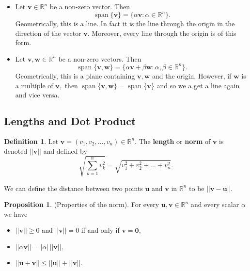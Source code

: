 \documentclass[12pt, a4paper]{article}
\theoremstyle{definition}
\newtheorem{definition}{Definition}[section]
\newtheorem{proposition}{Proposition}
\theoremstyle{plain}
\newcommand{\bb}[1]{\mathbb{#1}}
\newcommand{\vect}[1]{\mathbf{#1}}
\DeclareMathOperator{\Span}{span}
\begin{document}
\begin{itemize}

	\item Let $\vect{v} \in \bb{R}^n$ be a non-zero vector. Then $$\Span\{\vect{v}\}=\{\alpha\vect{v}:\alpha \in \bb{R}^n\}.$$ Geometrically, this is a line. In fact it is the line through the origin in the direction of the vector $\vect{v}.$ Moreover, every line through the origin is of this form.

	\item Let $\vect{v}, \vect{w} \in \bb{R}^n$ be a non-zero vectors. Then $$\Span\{\vect{v},\vect{w}\}=\{\alpha\vect{v}+\beta\vect{w}:\alpha,\beta \in \bb{R}^n\}.$$ Geometrically, this is a plane containing $\vect{v},\vect{w}$ and the origin. However, if $\vect{w}$ is a multiple of $\vect{v},$ then $\Span\{\vect{v},\vect{w}\}= \Span\{\vect{v}\}$ and so we a get a line again and vice versa.

\end{itemize}

\subsection{Lengths and Dot Product}

\begin{definition} Let $\vect{v}=(v_1,v_2,\ldots,v_n) \in \bb{R}^n.$ The \textbf{length} or \textbf{norm} of $\vect{v}$ is denoted $||\vect{v}||$ and defined by $$\sqrt{\sum_{k=1}^{n} v_k^2} = \sqrt{v_1^2+v_2^2+\ldots+v_n^2}. $$ \end{definition}

We can define the distance between two points $\vect{u}$ and $\vect{v}$ in $\bb{R}^n$ to be $||\vect{v-u}||.$

\begin{proposition} (Properties of the norm). For every $\vect{u},\vect{v} \in \bb{R}^n$ and every scalar $\alpha$ we have 

\begin{itemize}

	\item $||\vect{v}||\geq0$ and $||\vect{v}||=0$ if and only if $\vect{v}=\vect{0},$

	\item $||\alpha\vect{v}||=|\alpha|\,||\vect{v}||,$

	\item $||\vect{u+v}||\leq||\vect{u}||+||\vect{v}||.$

\end{itemize}

\end{proposition}
\end{document}
